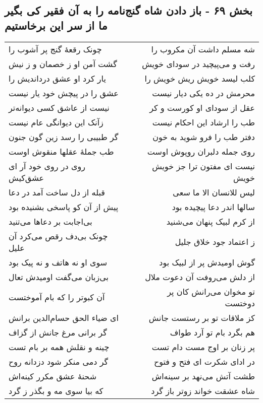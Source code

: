 \begin{center}
\section*{بخش ۶۹ - باز دادن شاه گنج‌نامه را به آن فقیر کی بگیر ما از سر این برخاستیم}
\label{sec:sh069}
\begin{longtable}{l p{0.5cm} r}
چونک رقعهٔ گنج پر آشوب را
&&
شه مسلم داشت آن مکروب را
\\
گشت آمن او ز خصمان و ز نیش
&&
رفت و می‌پیچید در سودای خویش
\\
یار کرد او عشق درداندیش را
&&
کلب لیسد خویش ریش خویش را
\\
عشق را در پیچش خود یار نیست
&&
محرمش در ده یکی دیار نیست
\\
نیست از عاشق کسی دیوانه‌تر
&&
عقل از سودای او کورست و کر
\\
زآنک این دیوانگی عام نیست
&&
طب را ارشاد این احکام نیست
\\
گر طبیبی را رسد زین گون جنون
&&
دفتر طب را فرو شوید به خون
\\
طب جملهٔ عقلها منقوش اوست
&&
روی جمله دلبران روپوش اوست
\\
روی در روی خود آر ای عشق‌کیش
&&
نیست ای مفتون ترا جز خویش خویش
\\
قبله از دل ساخت آمد در دعا
&&
لیس للانسان الا ما سعی
\\
پیش از آن کو پاسخی بشنیده بود
&&
سالها اندر دعا پیچیده بود
\\
بی‌اجابت بر دعاها می‌تنید
&&
از کرم لبیک پنهان می‌شنید
\\
چونک بی‌دف رقص می‌کرد آن علیل
&&
ز اعتماد جود خلاق جلیل
\\
سوی او نه هاتف و نه پیک بود
&&
گوش اومیدش پر از لبیک بود
\\
بی‌زبان می‌گفت اومیدش تعال
&&
از دلش می‌روفت آن دعوت ملال
\\
آن کبوتر را که بام آموختست
&&
تو مخوان می‌رانش کان پر دوختست
\\
ای ضیاء الحق حسام‌الدین برانش
&&
کز ملاقات تو بر رستست جانش
\\
گر برانی مرغ جانش از گزاف
&&
هم بگرد بام تو آرد طواف
\\
چینه و نقلش همه بر بام تست
&&
پر زنان بر اوج مست دام تست
\\
گر دمی منکر شود دزدانه روح
&&
در ادای شکرت ای فتح و فتوح
\\
شحنهٔ عشق مکرر کینه‌اش
&&
طشت آتش می‌نهد بر سینه‌اش
\\
که بیا سوی مه و بگذر ز گرد
&&
شاه عشقت خواند زوتر باز گرد
\\

\end{longtable}
\end{center}
